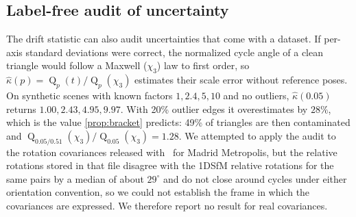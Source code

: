 \subsection{Label-free audit of uncertainty}\label{sec:audit}
The drift statistic can also audit uncertainties that come with a dataset. If per-axis standard deviations were correct, the normalized cycle angle of a clean triangle would follow a Maxwell ($\chi_3$) law to first order, so $\hat\kappa(p)=\operatorname{Q}_p(t)/\operatorname{Q}_p(\chi_3)$ estimates their scale error without reference poses. On synthetic scenes with known factors $1, 2.4, 5, 10$ and no outliers, $\hat\kappa(0.05)$ returns $1.00, 2.43, 4.95, 9.97$. With 20\% outlier edges it overestimates by $28\%$, which is the value \cref{prop:bracket} predicts: 49\% of triangles are then contaminated and $\operatorname{Q}_{0.05/0.51}(\chi_3)/\operatorname{Q}_{0.05}(\chi_3)=1.28$. We attempted to apply the audit to the rotation covariances released with~\cite{zhang2023revisiting} for Madrid Metropolis, but the relative rotations stored in that file disagree with the 1DSfM relative rotations for the same pairs by a median of about $29^\circ$ and do not close around cycles under either orientation convention, so we could not establish the frame in which the covariances are expressed. We therefore report no result for real covariances.


